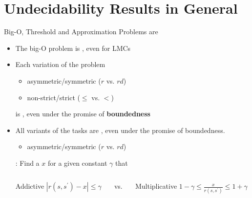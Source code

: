 \documentclass[aspectratio=169]{beamer}
\begin{document}
\section{Undecidability Results in General}
\begin{frame}{Big-O, Threshold and Approximation Problems are }
    \begin{itemize}
        \item The big-O problem is , even for LMCs
        \item Each variation of the problem
        \begin{itemize}
            \item asymmetric/symmetric ($r$ vs. $rd$)
            \item non-strict/strict
            ($\le$ vs. $<$)
        \end{itemize}
        is , even under the promise of \textbf{boundedness}
        \item All variants of the  tasks are , even under the promise of boundedness.
        \begin{itemize}
            \item asymmetric/symmetric ($r$ vs. $rd$)
        \end{itemize}
        
        : Find a $x$ for a given constant $\gamma$ that
        \begin{columns}
            \begin{column}{.4\textwidth}
                \begin{block}{Addictive}
                    $|r(s,s^\prime) - x|\le \gamma$ 
                \end{block}
            \end{column}
            \begin{column}{.1\textwidth}
                vs.
            \end{column}
            \begin{column}{.4\textwidth}
                \begin{block}{Multiplicative}
                    $1-\gamma \le \frac{x}{r(s,s^\prime)}\le 1+ \gamma$ 
                \end{block}
            \end{column}
        \end{columns}
    \end{itemize}
\end{frame}
\end{document}
